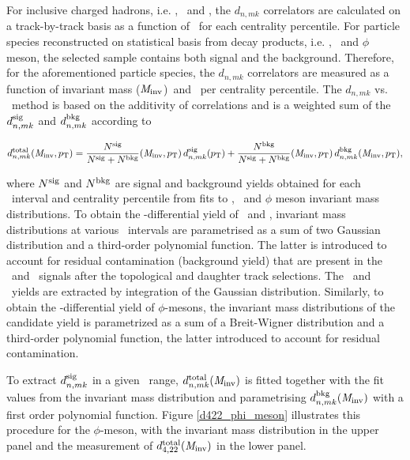 For inclusive charged hadrons, i.e. \pion, \kaon~and \proton, the $d_{n,mk}$ correlators are calculated on a track-by-track basis as a function of \pT~for each centrality percentile. For particle species reconstructed on statistical basis from decay products, i.e. \Ks, \lambdas~and $\phi$ meson, the selected sample contains both signal and the background. Therefore, for the aforementioned particle species, the $d_{n,mk}$ correlators are measured as a function of invariant mass (${\it M}_{\rm inv}$)~and \pT~per centrality percentile. The $d_{n,mk}$ vs. \minv~method is based on the additivity of correlations and is a weighted sum of the $d_{n,mk}^{\rm{sig}}$ and $d_{n,mk}^{\rm{bkg}}$ according to

\begin{equation}
d_{n,mk}^{\rm total}({\it M}_{\rm inv}, p_{\rm T}) = \frac{N^{\rm sig}}{N^{\rm sig}+N^{\rm bkg}}({\it M}_{\rm inv}, p_{\rm T})\,d_{n,mk}^{\rm sig}(p_{\rm T})+\frac{N^{\rm bkg}}{N^{{\rm sig}}+N^{{\rm bkg}}}({\it M}_{\rm inv}, p_{\rm T})\,d_{n,mk}^{\rm bkg}({\it M}_{\rm inv}, p_{\rm T}),
\label{Eq:dnmk}
\end{equation}

where $N^{\rm{sig}}$ and $N^{\rm{bkg}}$ are signal and background yields obtained for each \pT~interval and centrality percentile from fits to \Ks, \lambdas~and $\phi$ meson invariant mass distributions. To obtain the \pT-differential yield of \Ks~and \lambdas, invariant mass distributions at various \pT~intervals are parametrised as a sum of two Gaussian distribution and a third-order polynomial function. The latter is introduced to account for residual contamination (background yield) that are present in the \Ks~and \lambdas~signals after the topological and daughter track selections. The \Ks~and \lambdas~yields are extracted by integration of the Gaussian distribution. %
Similarly, to obtain the \pT-differential yield of $\phi$-mesons, the invariant mass distributions of the candidate yield is parametrized as a sum of a Breit-Wigner distribution and a third-order polynomial function, the latter introduced to account for residual contamination.

To extract $d_{n,mk}^{\rm{sig}}$ in a given \pT~range, $d_{n,mk}^{\rm total}({\it M}_{\rm inv})$ is fitted together with the fit values from the invariant mass distribution and parametrising $d_{n,mk}^{\rm{bkg}}({\it M}_{\rm inv})$ with a first order polynomial function. Figure \ref{d422_phi_meson} illustrates this procedure for the $\phi$-meson, with the invariant mass distribution in the upper panel and the measurement of $d_{4,22}^{\rm total}({\it M}_{\rm inv})$ in the lower panel. 

